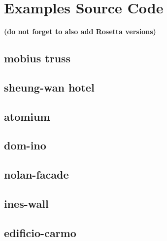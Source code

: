 
\chapter{Examples Source Code}
\label{appendix:test:source:code}

{\bf(do not forget to also add Rosetta versions)}

\section{mobius truss}

\section{sheung-wan hotel}

\section{atomium}

\section{dom-ino}

\section{nolan-facade}

\section{ines-wall}

\section{edificio-carmo}
